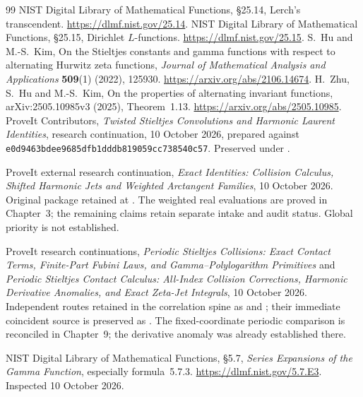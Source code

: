 \begin{thebibliography}{99}
NIST Digital Library of Mathematical Functions, \S25.14, Lerch's transcendent.
\url{https://dlmf.nist.gov/25.14}.
NIST Digital Library of Mathematical Functions, \S25.15, Dirichlet $L$-functions.
\url{https://dlmf.nist.gov/25.15}.
S.~Hu and M.-S.~Kim, On the Stieltjes constants and gamma functions with
respect to alternating Hurwitz zeta functions, \emph{Journal of Mathematical
Analysis and Applications} \textbf{509}(1) (2022), 125930.
\url{https://arxiv.org/abs/2106.14674}.
H.~Zhu, S.~Hu and M.-S.~Kim, On the properties of alternating invariant
functions, arXiv:2505.10985v3 (2025), Theorem~1.13.
\url{https://arxiv.org/abs/2505.10985}.
ProveIt Contributors, \emph{Twisted Stieltjes Convolutions and Harmonic
Laurent Identities}, research continuation, 10 October 2026, prepared against
\nolinkurl{e0d9463bdee9685dfb1dddb819059cc738540c57}.
Preserved under .

ProveIt external research continuation,
\emph{Exact Identities: Collision Calculus, Shifted Harmonic Jets and
Weighted Arctangent Families}, 10 October 2026.
Original package retained at
.
The weighted real evaluations are proved in Chapter~3; the remaining
claims retain separate intake and audit status. Global priority is not established.

ProveIt research continuations,
\emph{Periodic Stieltjes Collisions: Exact Contact Terms, Finite-Part Fubini
Laws, and Gamma--Polylogarithm Primitives} and
\emph{Periodic Stieltjes Contact Calculus: All-Index Collision Corrections,
Harmonic Derivative Anomalies, and Exact Zeta-Jet Integrals}, 10 October 2026.
Independent routes retained in the correlation spine as
 and
; their immediate coincident
source is preserved as .
The fixed-coordinate periodic comparison is reconciled in Chapter~9;
the derivative anomaly was already established there.

NIST Digital Library of Mathematical Functions, \S5.7,
\emph{Series Expansions of the Gamma Function}, especially formula~5.7.3.
\url{https://dlmf.nist.gov/5.7.E3}. Inspected 10 October 2026.


\end{thebibliography}
